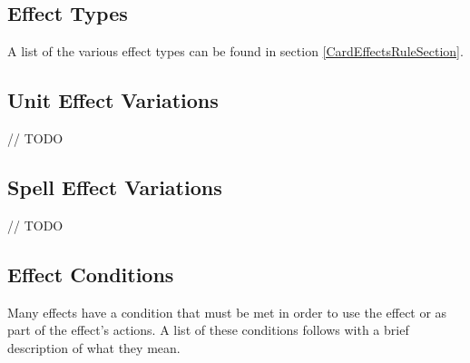 \subsection{Effect Types}
A list of the various effect types can be found in section \ref{CardEffectsRuleSection}.


\subsection{Unit Effect Variations}
// TODO

\subsection{Spell Effect Variations}
// TODO


\subsection{Effect Conditions}
Many effects have a condition that must be met in order to use the effect or as part of the effect's actions. A list of these conditions follows with a brief description of what they mean.
